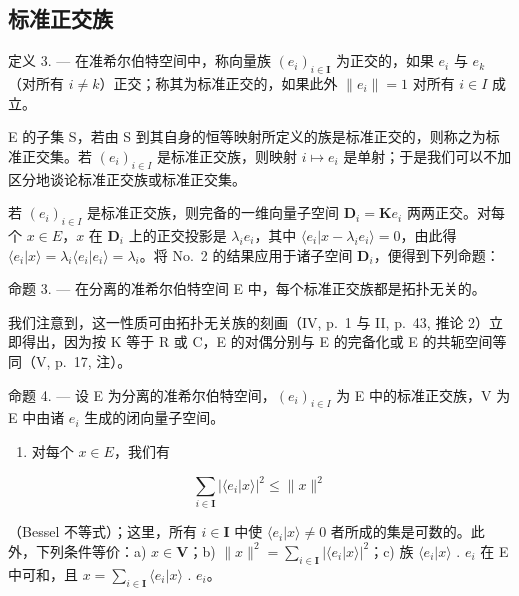 \subsection{标准正交族}

定义 3. --- 在准希尔伯特空间中，称向量族 \((e_{i})_{i\in\mathbf{I}}\) 为正交的，如果 \(e_{i}\) 与 \(e_{k}\)（对所有 \(i\neq k\)）正交；称其为标准正交的，如果此外 \(\|e_{i}\|=1\) 对所有 \(i\in I\) 成立。

E 的子集 S，若由 S 到其自身的恒等映射所定义的族是标准正交的，则称之为标准正交集。若 \((e_{i})_{i\in I}\) 是标准正交族，则映射 \(i\mapsto e_{i}\) 是单射；于是我们可以不加区分地谈论标准正交族或标准正交集。

若 \((e_i)_{i\in I}\) 是标准正交族，则完备的一维向量子空间 \(\mathbf{D}_i = \mathbf{K}e_i\) 两两正交。对每个 \(x\in E\)，\(x\) 在 \(\mathbf{D}_i\) 上的正交投影是 \(\lambda_i e_i\)，其中 \(\langle e_i|x - \lambda_i e_i\rangle = 0\)，由此得 \(\langle e_i|x\rangle = \lambda_i\langle e_i|e_i\rangle = \lambda_i\)。将 No.~2 的结果应用于诸子空间 \(\mathbf{D}_i\)，便得到下列命题：

命题 3. --- 在分离的准希尔伯特空间 E 中，每个标准正交族都是拓扑无关的。

我们注意到，这一性质可由拓扑无关族的刻画（IV, p.~1 与 II, p.~43, 推论 2）立即得出，因为按 K 等于 R 或 C，E 的对偶分别与 E 的完备化或 E 的共轭空间等同（V, p.~17, 注）。

命题 4. --- 设 E 为分离的准希尔伯特空间，\((e_{i})_{i\in I}\) 为 E 中的标准正交族，V 为 E 中由诸 \(e_{i}\) 生成的闭向量子空间。

\begin{enumerate}
\def\labelenumi{\arabic{enumi})}
\tightlist
\item
  对每个 \(x \in E\)，我们有
\end{enumerate}

\[
\sum_ {i \in \mathbf {I}} \left| \langle e _ {i} | x \rangle \right| ^ {2} \leqslant \| x \| ^ {2}\tag{1}
\]

（Bessel 不等式）；这里，所有 \(i \in \mathbf{I}\) 中使 \(\langle e_i|x\rangle \neq 0\) 者所成的集是可数的。此外，下列条件等价：a) \(x \in \mathbf{V}\)；b) \(\|x\|^2 = \sum_{i \in \mathbf{I}} |\langle e_i|x\rangle|^2\)；c) 族 \(\langle e_i|x\rangle\) . \(e_i\) 在 E 中可和，且 \(x = \sum_{i \in \mathbf{I}} \langle e_i|x\rangle\) . \(e_i\)。

